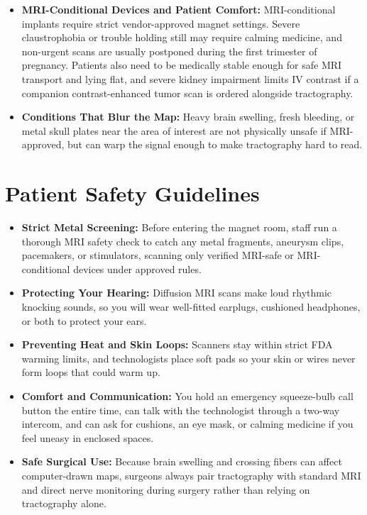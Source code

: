 \begin{itemize}
    \item \textbf{MRI-Conditional Devices and Patient Comfort:} MRI-conditional implants require strict vendor-approved magnet settings. Severe claustrophobia or trouble holding still may require calming medicine, and non-urgent scans are usually postponed during the first trimester of pregnancy. Patients also need to be medically stable enough for safe MRI transport and lying flat, and severe kidney impairment limits IV contrast if a companion contrast-enhanced tumor scan is ordered alongside tractography.
    \item \textbf{Conditions That Blur the Map:} Heavy brain swelling, fresh bleeding, or metal skull plates near the area of interest are not physically unsafe if MRI-approved, but can warp the signal enough to make tractography hard to read.
\end{itemize}

\section{Patient Safety Guidelines}

\begin{itemize}
    \item \textbf{Strict Metal Screening:} Before entering the magnet room, staff run a thorough MRI safety check to catch any metal fragments, aneurysm clips, pacemakers, or stimulators, scanning only verified MRI-safe or MRI-conditional devices under approved rules.
    \item \textbf{Protecting Your Hearing:} Diffusion MRI scans make loud rhythmic knocking sounds, so you will wear well-fitted earplugs, cushioned headphones, or both to protect your ears.
    \item \textbf{Preventing Heat and Skin Loops:} Scanners stay within strict FDA warming limits, and technologists place soft pads so your skin or wires never form loops that could warm up.
    \item \textbf{Comfort and Communication:} You hold an emergency squeeze-bulb call button the entire time, can talk with the technologist through a two-way intercom, and can ask for cushions, an eye mask, or calming medicine if you feel uneasy in enclosed spaces.
    \item \textbf{Safe Surgical Use:} Because brain swelling and crossing fibers can affect computer-drawn maps, surgeons always pair tractography with standard MRI and direct nerve monitoring during surgery rather than relying on tractography alone.
\end{itemize}

